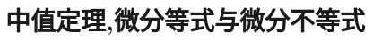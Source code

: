 \documentclass[8pt a4paper, oneside, UTF8]{ctexbook}  %
\begin{document}
\begin{sloppypar}
    \else
    \fi
    \chapter{中值定理,微分等式与微分不等式}

    \ifx\allfiles\undefined
\end{sloppypar}
\end{document}
